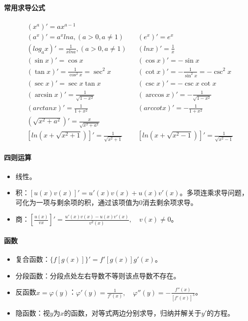\documentclass[
12pt, %
a4paper, 
oneside, %
]{scrartcl}
\begin{document}
\paragraph{常用求导公式}
\begin{align*}
&(x^a)' = ax^{a - 1} \\
&(a^x)' = a^x lna,(a > 0, a \neq 1)& &(e^x)' = e^x \\
&(log_a x)' = \frac{1}{x lna},(a > 0, a \neq 1)& &(ln x)' = \frac{1}{x} \\
&(\sin x)' = \cos x& &(\cos x)' = -\sin x \\
&(\tan x)' = \frac{1}{\cos^2 x} = \sec^2 x& &(\cot x)' = -\frac{1}{\sin^2 x} = -\csc^2 x \\
&(\sec x)' = \sec x \tan x& &(\csc x)' = -\csc x \cot x \\
&(\arcsin x)' = \frac{1}{\sqrt{1 - x^2}}& &(\arccos x)' = -\frac{1}{\sqrt{1 - x^2}} \\
&(arctan x)' = \frac{1}{1 + x^2}& &(arccot x)' = -\frac{1}{1 + x^2} \\
&(\sqrt{x^2 + a^2})' = \frac{x}{\sqrt{x^2 + a^2}} \\
&[ln(x + \sqrt{x^2 + 1})]' = \frac{1}{\sqrt{x^2 + 1}}& &[ln(x + \sqrt{x^2 - 1})]' = \frac{1}{\sqrt{x^2 - 1}} 
\end{align*}
\paragraph{四则运算}
\begin{itemize}
\item 线性。
\item 积：$ [u(x)v(x)]' = u'(x)v(x) + u(x)v'(x) $。多项连乘求导问题，可化为一项与剩余项的积，通过该项值为$ 0 $消去剩余项求导。
\item 商：$ [\frac{u(x)}{v{x}}]' = \frac{u'(x)v(x) - u(x)v'(x)}{v^2(x)}, \quad v(x) \neq 0 $。
\end{itemize}
\paragraph{函数}
\begin{itemize}
\item 复合函数：$ \{f[g(x)]\}' = f'[g(x)]g'(x) $。
\item 分段函数：分段点处左右导数不等则该点导数不存在。
\item 反函数$ x = \varphi(y) $：$ \varphi'(y) = \frac{1}{f'(x)}, \quad \varphi''(y) = -\frac{f''(x)}{[f'(x)]^3} $。
\item 隐函数：视$ y $为$ x $的函数，对等式两边分别求导，归纳并解关于$ y' $的方程。
\end{itemize}
\end{document}
